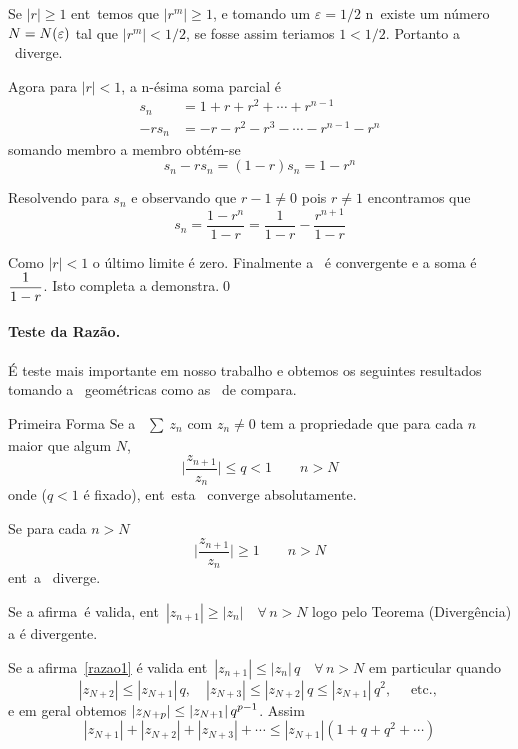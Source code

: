 \prova Se $|r|\geq 1$ ent\ao\ temos que $|r^m|\geq 1$, e
tomando um $\varepsilon=1/2$ n\ao\ existe um n\'umero $N=N(\varepsilon)$
tal que $|r^m|< 1/2$, se fosse assim teriamos $1< 1/2$. Portanto a
\ser\ diverge.

Agora para $|r|<1$, a n-\'esima soma parcial \'e
\begin{align*}
s_n&=1+r+r^2+\cdots+r^{n-1}\\[2ex]
-rs_n&=-r-r^2-r^3-\cdots-r^{n-1}-r^n
\end{align*}
somando membro a membro obt\'{e}m-se
\begin{equation*}
  s_n-rs_n=(1-r)s_n=1-r^{n}
\end{equation*}

 Resolvendo para $s_n$ e observando que $r-1\neq 0$ pois $r\neq 1$
 encontramos que
\begin{equation*}
  s_n=\frac{1-r^{n}}{1-r}=\frac{1}{1-r}-\frac{r^{n+1}}{1-r}
\end{equation*}

Como $|r|<1$ o \'ultimo limite \'e zero. Finalmente a \ser\ \'e
convergente e a soma \'e $\displaystyle{\frac{1}{1-r}}$. Isto completa a
demonstra\cao.\qed

\paragraph{Teste da Raz\~ao.} \'E teste mais importante em nosso
trabalho e obtemos os seguintes resultados tomando a \sers\
geom\'{e}tricas como as \sers\ de compara\cao.

\begin{theoc}{Primeira Forma}{}
Se a \ser\ $\sum_{}\,z_{n}$ com $z_{n}\neq 0$ tem a
propriedade que para cada $n$ maior que algum $N$,
\begin{equation}\label{razao}
\Biggl|\dfrac{z_{n+1}}{z_n}\Biggr|\leq q <1\qquad n>N
\end{equation}
onde ($q<1$ \'e fixado), ent\ao\ esta \ser\ converge
absolutamente.

Se para cada $n>N$
\begin{equation}\label{razao1}
\Biggl|\frac{z_{n+1}}{z_n}\Biggr|\geq 1\qquad n>N
\end{equation}
ent\ao\ a \ser\ diverge.
\end{theoc}

\prova Se a afirma\cao\ \'e valida, ent\ao\
$|z_{n+1}|\geq |z_n|\quad \forall\, n>N$ logo pelo Teorema
 (Diverg\^encia) a \ser \'e divergente.

 Se a afirma\cao\ \eqref{razao1} \'e valida ent\ao\ $|z_{n+1}|\leq |z_n|\,q\quad
 \forall\, n>N$ em particular quando
\begin{equation*}
  |z_{N+2}|\leq |z_{N+1}|\,q,\quad |z_{N+3}|\leq |z_{N+2}|\,q\leq
  |z_{N+1}|\,q^2,\quad\text{ etc., }
\end{equation*}
e em geral obtemos $\displaystyle{|z_{N+p}|\leq |z_{N+1}|\,q^{p-1}}$. Assim
\begin{equation*}
  |z_{N+1}|+|z_{N+2}|+|z_{N+3}|+\cdots\leq
  |z_{N+1}|(1+q+q^2+\cdots)
\end{equation*}

